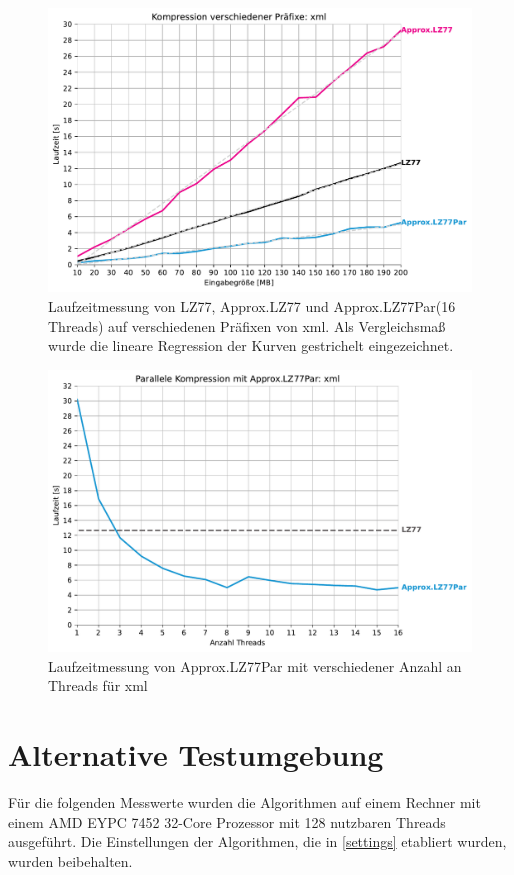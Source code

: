 \begin{figure}[H]
    \centering
    \caption{Laufzeitmessung von LZ77, Approx.LZ77 und Approx.LZ77Par(16 Threads) auf verschiedenen Präfixen von xml. Als Vergleichsmaß wurde 
    die lineare Regression der Kurven gestrichelt eingezeichnet.}
    \includegraphics[scale=0.65]{Images/progressive_xml.pdf}
\end{figure}

\begin{figure}[H]
    \centering
    \caption{Laufzeitmessung von Approx.LZ77Par mit verschiedener Anzahl an Threads für xml}
    \includegraphics[scale=0.65]{Images/progressive_speedup_xml.pdf}
\end{figure}
\pagebreak
\section{Alternative Testumgebung}
Für die folgenden Messwerte wurden die Algorithmen auf einem Rechner mit einem AMD EYPC 7452 32-Core Prozessor mit 128 nutzbaren Threads ausgeführt.
Die Einstellungen der Algorithmen, die in \ref{settings} etabliert wurden, wurden beibehalten.

